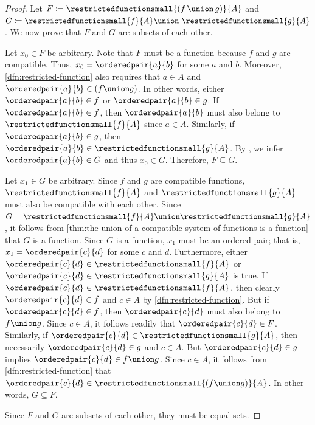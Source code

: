 \begin{proof}
    Let \( F \coloneq \restrictedfunctionsmall{ \mleft( f \,{\union}\, g \mright) }{A} \) and \( G \coloneq \restrictedfunctionsmall{f}{A} \union\,\, \restrictedfunctionsmall{g}{A} \).
    We now prove that \( F \) and \( G \) are subsets of each other.

    \vspace{0.3cm}
    \noindent
    Let \( x_{0} \in F \) be arbitrary. Note that \( F \) must be a function because \( f \) and \( g \) are compatible. Thus, \( x_{0} = \orderedpair{a}{b} \)
    for some \( a \) and \( b \). Moreover, \cref{dfn:restricted-function} also requires that \( a \in A \) and \( \orderedpair{a}{b} \in \mleft( f \union g \mright) \).
    In other words, either \( \orderedpair{a}{b} \in f \) or \( \orderedpair{a}{b} \in g \).
    If \( \orderedpair{a}{b} \in f \), then \( \orderedpair{a}{b} \) must also belong to \( \restrictedfunctionsmall{f}{A} \) since \( a \in A \).
    Similarly, if \( \orderedpair{a}{b} \in g \), then \( \orderedpair{a}{b} \in \restrictedfunctionsmall{g}{A} \).
    By , we infer \( \orderedpair{a}{b} \in G \) and thus \( x_{0} \in G \).
    Therefore, \( F \subseteq G \).

    \vspace{0.3cm}
    \noindent
    Let \( x_{1} \in G \) be arbitrary. Since \( f \) and \( g \) are compatible functions, \( \restrictedfunctionsmall{f}{A} \) and \( \restrictedfunctionsmall{g}{A} \)
    must also be compatible with each other. Since \( G = \restrictedfunctionsmall{f}{A} \union \restrictedfunctionsmall{g}{A} \), it follows from
    \cref{thm:the-union-of-a-compatible-system-of-functions-is-a-function} that \( G \) is a function.
    Since \( G \) is a function, \( x_{1} \) must be an ordered pair; that is, \( x_{1} = \orderedpair{c}{d} \) for some \( c \) and \( d \).
    Furthermore, either \( \orderedpair{c}{d} \in \restrictedfunctionsmall{f}{A} \) or \( \orderedpair{c}{d} \in \restrictedfunctionsmall{g}{A} \) is true.
    If \( \orderedpair{c}{d} \in \restrictedfunctionsmall{f}{A} \), then clearly \( \orderedpair{c}{d} \in f \) and \( c \in A \) by \cref{dfn:restricted-function}.
    But if \( \orderedpair{c}{d} \in f \), then \( \orderedpair{c}{d} \) must also belong to \( f \union g \). Since \( c \in A \), it follows readily
    that \( \orderedpair{c}{d} \in F \).
    Similarly, if \( \orderedpair{c}{d} \in \restrictedfunctionsmall{g}{A} \), then necessarily \( \orderedpair{c}{d} \in g \) and \( c \in A \).
    But \( \orderedpair{c}{d} \in g \) implies \( \orderedpair{c}{d} \in f \union g \). Since \( c \in A \), it follows from \cref{dfn:restricted-function}
    that \( \orderedpair{c}{d} \in \restrictedfunctionsmall{\mleft( f \union g \mright)}{A} \).
    In other words, \( G \subseteq F \).

    \vspace{0.3cm}
    \noindent
    Since \( F \) and \( G \) are subsets of each other, they must be equal sets.
\end{proof}

